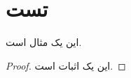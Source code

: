 \documentclass{matinbook}
\begin{document}
\chapter{تست}

\begin{example}[تست]
    این یک مثال است.
\end{example}

\begin{proof}
    این یک اثبات است.
\end{proof}
\end{document}
